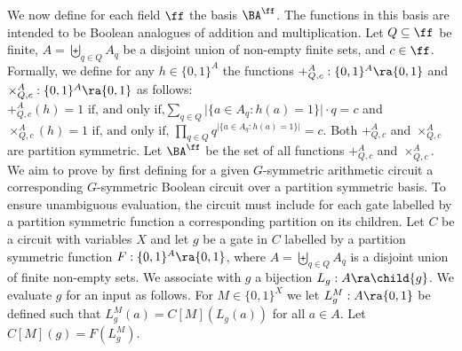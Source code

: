 \documentclass{toc}
\begin{document}
We now define for each field $\ff$ the basis $\BA^{\ff}$. The functions in this
basis are intended to be Boolean analogues of addition and multiplication. Let
$Q \subseteq \ff$ be finite, $A = \biguplus_{q \in Q}A_q$ be a disjoint union of
non-empty finite sets, and $c \in \ff$.  Formally, we define for any $h \in \{0,1\}^{A}$ the functions $+^A_{Q, c}: \{0,
1\}^A \ra \{0, 1\}$ and $\times^A_{Q, c}: \{0, 1\}^A \ra \{0, 1\}$ as follows: $ +^{A}_{Q, c}(h) = 1
\text{ if, and only if,} \sum_{q \in Q} \vert \{a \in A_q : h(a) = 1\} \vert
\cdot q = c $ and $ \times^{A}_{Q, c}(h) = 1 \text{ if, and only if, } \prod_{q
  \in Q} q^{\vert \{a \in A_q : h(a) = 1\} \vert} = c$. Both $+^A_{Q, c}$ and
$\times^A_{Q, c}$ are partition symmetric. Let $\BA^{\ff}$ be the set of all
functions $+^A_{Q, c}$ and $\times^A_{Q, c}$.
We aim to prove  by first defining for a
given $G$-symmetric arithmetic circuit a corresponding $G$-symmetric Boolean
circuit over a partition symmetric basis. To ensure unambiguous evaluation, the
circuit must include for each gate labelled by a partition symmetric function a
corresponding partition on its children. Let $C$ be a circuit with variables $X$
and let $g$ be a gate in $C$ labelled by a partition symmetric function $F :
\{0, 1\}^A \ra \{0, 1\}$, where $A = \biguplus_{q \in Q}A_q$ is a disjoint union
of finite non-empty sets. We associate with $g$ a bijection $L_g : A \ra
\child{g}$. We evaluate $g$ for an input as follows. For $M \in \{0, 1\}^{X}$ we
let $L^M_g : A \ra \{0, 1\}$ be defined such that $L^M_g(a) = C[M](L_g(a))$ for
all $a \in A$. Let $C[M](g) = F(L^M_g)$.
\end{document}
